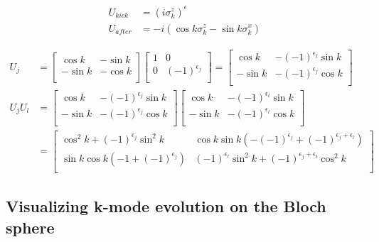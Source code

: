 \documentclass[11pt,a4paper]{article}
\begin{document}
  	\begin{align}
  	U_{kick} &= (i\sigma_{k}^z)^\epsilon\\
  	U_{after}& =  -i  (\cos k \sigma_{k}^z - \sin k \sigma_{k}^x )
  	\end{align}
  	
  	\begin{align}
  	U_{j} &=   \begin{bmatrix}
  	\cos k & -\sin k\\
  	-\sin k & -\cos k \\ 
  	\end{bmatrix} \begin{bmatrix}
  	1& 0 \\
  	0 & (-1)^{\epsilon_{j}}\\
  	\end{bmatrix} =  \begin{bmatrix}
  	\cos k & -(-1)^{\epsilon_{j}}\sin k \\
  	-\sin k & -(-1)^{\epsilon_{j}}\cos k \\  
  	\end{bmatrix}\\
   	U_{j}U_{l} 	&=  \begin{bmatrix}
  	\cos k & -(-1)^{\epsilon_{j}}\sin k \\
  	-\sin k & -(-1)^{\epsilon_{j}}\cos k \\  
  	\end{bmatrix}  \begin{bmatrix}
  	\cos k & -(-1)^{\epsilon_{l}}\sin k \\
  	-\sin k & -(-1)^{\epsilon_{l}}\cos k \\  
  	\end{bmatrix}\\
  	& = \begin{bmatrix}
  	\cos^2 k + (-1)^{\epsilon_{j}}\sin^2 k & \cos k \sin k(-(-1)^{\epsilon_{j}} + (-1)^{\epsilon_{j}+\epsilon_{l}})\\
  	\sin k \cos k (-1 + (-1)^{\epsilon_{j}})& (-1)^{\epsilon_{l}}\sin^2 k + (-1)^{\epsilon_{j}+\epsilon_{l}}\cos^2  k\\
  	\end{bmatrix}
    	\end{align}
 	
 	
 	
 	
 	
 	
		\subsection[Geometric picture]{Visualizing k-mode evolution on the Bloch sphere}
		
\end{document}
